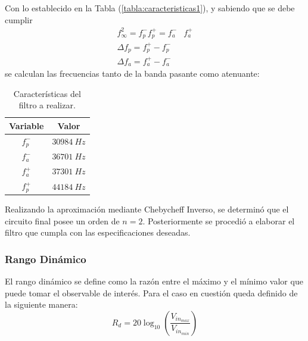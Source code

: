 Con lo establecido en la Tabla (\ref{tabla:caracteristicas1}), y sabiendo que se debe cumplir
\begin{equation*}
\begin{split}
	f_{\infty}^{2} = f_{p}^{-} f_{p}^{+} = f_{a}^{-} & f_{a}^{+} \\
	\Delta f_p = f_{p}^{+} - f_{p}^{-} \\
	\Delta f_a = f_{a}^{+} - f_{a}^{-} 
\end{split}
\end{equation*}
se calculan las frecuencias tanto de la banda pasante como atenuante:
\begin{table}[H]
\centering
\begin{tabular}{cc}
\hline
\textbf{Variable} & \textbf{Valor} \\
\hline
$f_{p}^{-}$ & $30984 \ Hz$ \\
$f_{a}^{-}$ & $36701 \ Hz$ \\
$f_{a}^{+}$ & $37301 \ Hz$ \\
$f_{p}^{+}$ & $44184\ Hz$ \\
\hline
\end{tabular}
\caption{Características del filtro a realizar.}
\label{tabla:caracteristicas2}
\end{table}

Realizando la aproximación mediante Chebycheff Inverso, se determinó que el circuito final posee un orden de $n = 2$. Posteriormente se procedió a elaborar el filtro que cumpla con las especificaciones deseadas.

\subsubsection{Rango Dinámico}
El rango dinámico se define como la razón entre el máximo y el mínimo valor que puede tomar el observable de interés. Para el caso en cuestión queda definido de la siguiente manera:
\begin{equation}
	R_d = 20 \log_{10} \left( \frac{V_{in_{max}}}{V_{in_{min}}} \right)
\end{equation}

